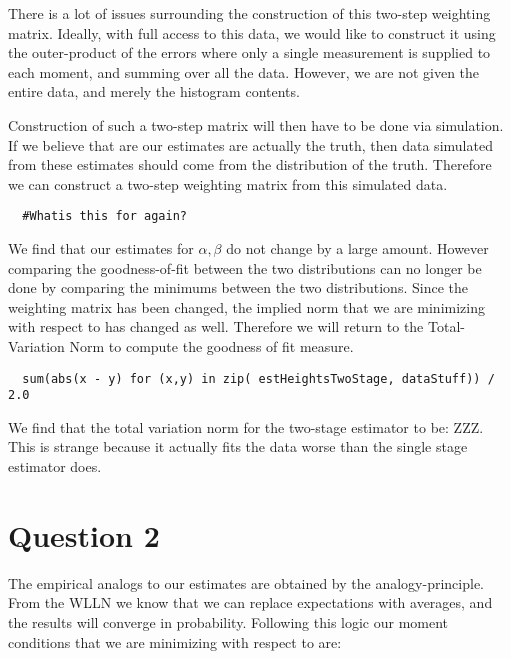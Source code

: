 \documentclass[12pt]{paper}
\begin{document}
There is a lot of issues surrounding the construction of this two-step
weighting matrix. Ideally, with full access to this data, we would
like to construct it using the outer-product of the errors where only
a single measurement is supplied to each moment, and summing over all
the data. However, we are not given the entire data, and merely the
histogram contents.

Construction of such a two-step matrix will then have to be done via
simulation. If we believe that are our estimates are actually the
truth, then data simulated from these estimates should come from the
distribution of the truth. Therefore we can construct a two-step
weighting matrix from this simulated data.

\begin{verbatim}
  #Whatis this for again?
\end{verbatim}

We find that our estimates for $\alpha,\beta$ do not change by a large
amount. However comparing the goodness-of-fit between the two
distributions can no longer be done by comparing the minimums between
the two distributions. Since the weighting matrix has been changed,
the implied norm that we are minimizing with respect to has changed as
well. Therefore we will return to the Total-Variation Norm to compute
the goodness of fit measure.

\begin{verbatim}
  sum(abs(x - y) for (x,y) in zip( estHeightsTwoStage, dataStuff)) / 2.0
\end{verbatim}

We find that the total variation norm for the two-stage estimator to
be: ZZZ. This is strange because it actually fits the data worse than
the single stage estimator does.


\section{Question 2}

The empirical analogs to our estimates are obtained by the
analogy-principle. From the WLLN we know that we can replace
expectations with averages, and the results will converge in
probability. Following this logic our moment conditions that we are
minimizing with respect to are:
\end{document}
